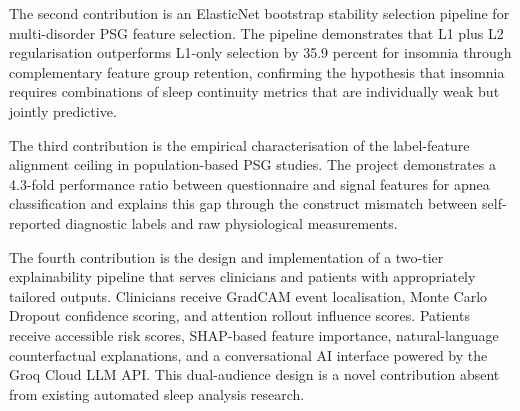The second contribution is an ElasticNet bootstrap stability selection pipeline for multi-disorder PSG feature selection. The pipeline demonstrates that L1 plus L2 regularisation outperforms L1-only selection by 35.9 percent for insomnia through complementary feature group retention, confirming the hypothesis that insomnia requires combinations of sleep continuity metrics that are individually weak but jointly predictive.

The third contribution is the empirical characterisation of the label-feature alignment ceiling in population-based PSG studies. The project demonstrates a 4.3-fold performance ratio between questionnaire and signal features for apnea classification and explains this gap through the construct mismatch between self-reported diagnostic labels and raw physiological measurements.

The fourth contribution is the design and implementation of a two-tier explainability pipeline that serves clinicians and patients with appropriately tailored outputs. Clinicians receive GradCAM event localisation, Monte Carlo Dropout confidence scoring, and attention rollout influence scores. Patients receive accessible risk scores, SHAP-based feature importance, natural-language counterfactual explanations, and a conversational AI interface powered by the Groq Cloud LLM API. This dual-audience design is a novel contribution absent from existing automated sleep analysis research.
